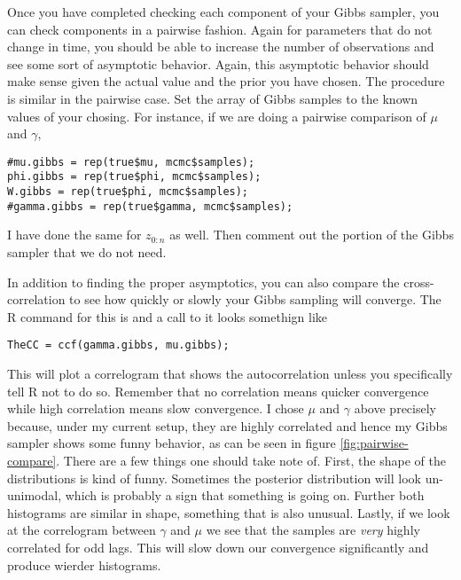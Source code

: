 \documentclass{article}
\begin{document}
Once you have completed checking each component of your Gibbs sampler, you can check components in a pairwise fashion.  Again for parameters that do not change in time, you should be able to increase the number of observations and see some sort of asymptotic behavior.  Again, this asymptotic behavior should make sense given the actual value and the prior you have chosen.  The procedure is similar in the pairwise case.  Set the array of Gibbs samples to the known values of your chosing.  For instance, if we are doing a pairwise comparison of $\mu$ and $\gamma$,
\begin{verbatim}
#mu.gibbs = rep(true$mu, mcmc$samples);
phi.gibbs = rep(true$phi, mcmc$samples);
W.gibbs = rep(true$phi, mcmc$samples);
#gamma.gibbs = rep(true$gamma, mcmc$samples);
\end{verbatim}
I have done the same for $z_{0:n}$ as well.
Then comment out the portion of the Gibbs sampler that we do not need.
\begin{comment}
\begin{verbatim}
  # Sample phi | e.e.
#  phi.gibbs[i] = phi.cond.post(x.data, W.gibbs[i-1], ...
  # Sample W | e.e.
#  W.gibbs[i] = W.cond.post(x.data, phi.gibbs[i], ...
  # Sample mu | e.e.
  mu.gibbs[i] = mu.cond.post(z.gibbs[,i-1], phi.gibbs[i], ...
  # Sample gamma | e.e.
  gamma.gibbs[i] = gamma.cond.post(x.data, W.gibbs[i], ...
  # Sample z | e.e.
#  z.gibbs[,i] = z.cond.post(y.data, mu.gibbs[i], m.nu, V, ... 
\end{verbatim}
\end{comment}
In addition to finding the proper asymptotics, you can also compare the cross-correlation to see how quickly or slowly your Gibbs sampling will converge.  The R command for this is  and a call to it looks somethign like
\begin{verbatim}
TheCC = ccf(gamma.gibbs, mu.gibbs);
\end{verbatim}
This will plot a correlogram that shows the autocorrelation unless you specifically tell R not to do so.
Remember that no correlation means quicker convergence while high correlation means slow convergence.  I chose $\mu$ and $\gamma$ above precisely because, under my current setup, they are highly correlated and hence my Gibbs sampler shows some funny behavior, as can be seen in figure \ref{fig:pairwise-compare}.  There are a few things one should take note of.  First, the shape of the distributions is kind of funny.  Sometimes the posterior distribution will look un-unimodal, which is probably a sign that something is going on.  Further both histograms are similar in shape, something that is also unusual.  Lastly, if we look at the correlogram between $\gamma$ and $\mu$ we see that the samples are \emph{very} highly correlated for odd lags.  This will slow down our convergence significantly and produce wierder histograms.
\end{document}
